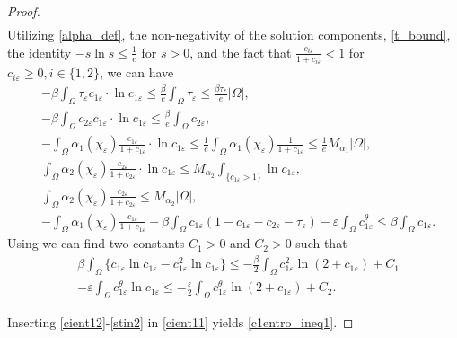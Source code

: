 \documentclass[a4paper,10pt]{article}
\theoremstyle{definition}
\begin{document}
\begin{proof}
\begin{align}
  \end{align}
 Utilizing \eqref{alpha_def},  the non-negativity of the solution components, \eqref{t_bound}, the identity $- s \ln s \leq \frac{1}{e}$ for $s > 0$, and the fact that $\frac{c_{i\varepsilon}}{1 + c_{i\varepsilon}} < 1$ for $c_{i\varepsilon} \geq 0, i \in \{1, 2\}$, we can have
  \begin{align}
  \label{cient12}
    & - \beta \int_\Omega \tau_\varepsilon c_{1\varepsilon} \cdot \ln c_{1\varepsilon} \leq \frac{\beta}{e} \int_\Omega \tau_\varepsilon \leq \frac{\beta\tau_\ast}{e}|\Omega|,  \\[5pt]
  \label{cient13}
   & -  \beta \int_\Omega c_{2\varepsilon} c_{1\varepsilon} \cdot \ln c_{1\varepsilon} \leq \frac{\beta}{e} \int_\Omega c_{2\varepsilon},  \\[5pt]
  \label{cient14}
   & -  \int_\Omega \alpha_1(\chi_\varepsilon)  \tfrac{c_{1\varepsilon}}{1 + c_{1\varepsilon}} \cdot \ln c_{1\varepsilon}  \leq \frac{1}{e} \int_\Omega \alpha_1(\chi_\varepsilon) \tfrac{1}{1 + c_{1\varepsilon}} \leq \frac{1}{e}M_{\alpha_1} |\Omega|, \\[5pt]
  \label{cient15}
  & \int_\Omega  \alpha_2(\chi_\varepsilon) \tfrac{c_{2\varepsilon}}{1 + c_{2\varepsilon}}  \cdot \ln c_{1\varepsilon} \leq  M_{\alpha_2}\int_{\{c_{1\varepsilon} > 1\}}  \ln c_{1\varepsilon},\\[5pt]
  \label{cient16}
  & \int_\Omega   \alpha_2(\chi_\varepsilon) \tfrac{c_{2\varepsilon}}{1 + c_{2\varepsilon}} \leq  M_{\alpha_2}|\Omega|, \\[5pt]
  \label{cient17}
  & - \int_\Omega \alpha_1(\chi_\varepsilon) \tfrac{c_{1\varepsilon}}{1 + c_{1\varepsilon}} + \beta \int_\Omega c_{1\varepsilon}(1 - c_{1\varepsilon} -  c_{2\varepsilon} - \tau_\varepsilon) - \varepsilon \int_\Omega c_{1\varepsilon}^\theta\leq \beta  \int_\Omega c_{1\varepsilon}.
 \end{align}
Using \cite[Lemma 4.2]{stinner2014global} we can find two constants $C_1 > 0$ and $C_2 > 0$ such that
\begin{align}
  \label{stin1} & \beta \int_\Omega \{c_{1\varepsilon} \ln c_{1\varepsilon} - c_{1\varepsilon}^2 \ln c_{1\varepsilon} \} \leq -\frac{\beta}{2} \int_\Omega c_{1\varepsilon}^2 \ln(2 + c_{1\varepsilon}) + C_1  \\[5pt]
  \label{stin2} & - \varepsilon \int_\Omega c_{1\varepsilon}^\theta \ln c_{1\varepsilon} \leq - \frac{\varepsilon}{2} \int_\Omega c_{1\varepsilon}^\theta \ln(2 + c_{1\varepsilon}) + C_2.
\end{align}

\noindent
Inserting \eqref{cient12}-\eqref{stin2} in \eqref{cient11} yields \eqref{c1entro_ineq1}.
\end{proof}
\end{document}
